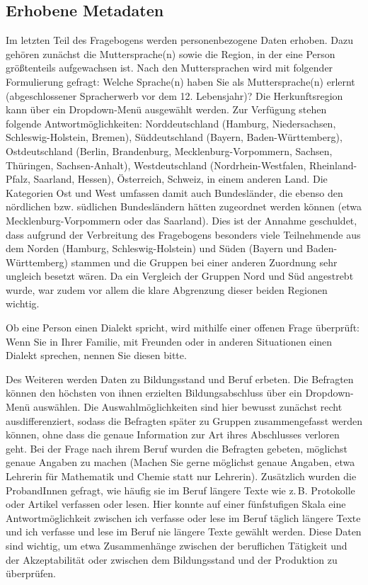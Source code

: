 \subsection{Erhobene Metadaten}
\label{sec:ME}
Im letzten Teil des Fragebogens werden personenbezogene Daten erhoben. Dazu gehören zunächst die Muttersprache(n) sowie die Region, in der eine Person größtenteils aufgewachsen ist. 
Nach den Muttersprachen wird mit folgender Formulierung gefragt: \glqq Welche Sprache(n) haben Sie als Muttersprache(n) erlernt (abgeschlossener Spracherwerb vor dem 12. Lebensjahr)?\grqq{} Die Herkunftsregion kann über ein Dropdown-Menü ausgewählt werden. Zur Verfügung stehen folgende Antwortmöglichkeiten: \glqq Norddeutschland (Hamburg, Niedersachsen, Schleswig-Holstein, Bremen)\grqq, \glqq Süddeutschland (Bayern, Baden-Württemberg)\grqq, \glqq Ostdeutschland (Berlin, Brandenburg, Mecklenburg-Vorpommern, Sachsen, Thüringen, Sachsen-Anhalt)\grqq, \glqq Westdeutschland (Nordrhein-Westfalen, Rheinland-Pfalz, Saarland, Hessen)\grqq, \glqq Österreich\grqq, \glqq Schweiz\grqq, \glqq in einem anderen Land\grqq. 
Die Kategorien Ost und West umfassen damit auch Bundesländer, die ebenso den nördlichen bzw. südlichen Bundesländern hätten zugeordnet werden können (etwa Mecklenburg-Vorpommern oder das Saarland). 
Dies ist der Annahme geschuldet, dass aufgrund der Verbreitung des Fragebogens besonders viele Teilnehmende aus dem Norden (Hamburg, Schleswig-Holstein) und Süden (Bayern und Baden-Württemberg) stammen und die Gruppen bei einer anderen Zuordnung sehr ungleich besetzt wären.
Da ein Vergleich der Gruppen Nord und Süd angestrebt wurde, war zudem vor allem die klare Abgrenzung dieser beiden Regionen wichtig. 

Ob eine Person einen Dialekt spricht, wird mithilfe einer offenen Frage überprüft: \glqq Wenn Sie in Ihrer Familie, mit Freunden oder in anderen Situationen einen Dialekt sprechen, nennen Sie diesen bitte.\grqq{} %

Des Weiteren werden Daten zu Bildungsstand und Beruf erbeten. 
Die Befragten können den höchsten von ihnen erzielten Bildungsabschluss über ein Dropdown-Menü auswählen. 
Die Auswahlmöglichkeiten sind hier bewusst zunächst recht ausdifferenziert, sodass die Befragten später zu Gruppen zusammengefasst werden können, ohne dass die genaue Information zur Art ihres Abschlusses verloren geht. 
Bei der Frage nach ihrem Beruf wurden die Befragten gebeten, möglichst genaue Angaben zu machen (\glqq Machen Sie gerne möglichst genaue Angaben, etwa \glq Lehrerin für Mathematik und Chemie\grq{} statt nur \glq Lehrerin\grq [...]\grqq). 
Zusätzlich wurden die ProbandInnen gefragt, wie häufig sie im Beruf längere Texte wie z.\,B. Protokolle oder Artikel verfassen oder lesen. 
Hier konnte auf einer fünfstufigen Skala eine Antwortmöglichkeit zwischen \glqq ich verfasse oder lese im Beruf täglich längere Texte\grqq{} und \glqq ich verfasse und lese im Beruf nie längere Texte\grqq{} gewählt werden. 
Diese Daten sind wichtig, um etwa Zusammenhänge zwischen der beruflichen Tätigkeit und der Akzeptabilität oder zwischen dem Bildungsstand und der Produktion zu überprüfen. 

